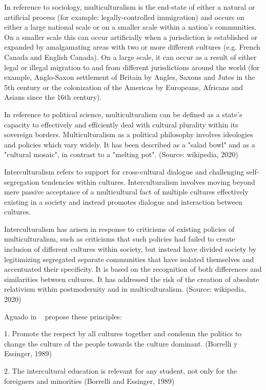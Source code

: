 \documentclass[fleqn,10pt,lineno]{wlpeerj} %
\begin{document}
In reference to sociology, multiculturalism is the end-state of either
a natural or artificial process (for example: legally-controlled
immigration) and occurs on either a large national scale or on a
smaller scale within a nation's communities. On a smaller scale this
can occur artificially when a jurisdiction is established or expanded
by amalgamating areas with two or more different cultures (e.g. French
Canada and English Canada). On a large scale, it can occur as a result
of either legal or illegal migration to and from different
jurisdictions around the world (for example, Anglo-Saxon settlement of
Britain by Angles, Saxons and Jutes in the 5th century or the
colonization of the Americas by Europeans, Africans and Asians since
the 16th century).

In reference to political science, multiculturalism can be defined as
a state's capacity to effectively and efficiently deal with cultural
plurality within its sovereign borders. Multiculturalism as a
political philosophy involves ideologies and policies which vary
widely. It has been described as a "salad bowl" and as a "cultural
mosaic", in contrast to a "melting pot". (Source: wikipedia, 2020)

Interculturalism refers to support for cross-cultural dialogue and
challenging self-segregation tendencies within cultures.
Interculturalism involves moving beyond mere passive acceptance of a
multicultural fact of multiple cultures effectively existing in a
society and instead promotes dialogue and interaction between
cultures.

Interculturalism has arisen in response to criticisms of existing
policies of multiculturalism, such as criticisms that such policies
had failed to create inclusion of different cultures within society,
but instead have divided society by legitimizing segregated separate
communities that have isolated themselves and accentuated their
specificity. It is based on the recognition of both differences and
similarities between cultures. It has addressed the risk of the
creation of absolute relativism within postmodernity and in
multiculturalism. (Source: wikipedia, 2020)

Aguado in ~\cite{odina1991educacion} propose these principles:

1. Promote the respect by all cultures together and condemn the
politics to change the culture of the people towards the culture
dominant. (Borrelli y Essinger, 1989)

2. The intercultural education is relevant for any student, not only
for the foreigners and minorities (Borrelli and Essinger, 1989)
\end{document}
